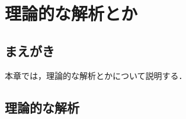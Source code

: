 \chapter{理論的な解析とか}
\label{sec:theoretical_analysis}

\section{まえがき}
本章では，理論的な解析とかについて説明する．

\section{理論的な解析}
\label{sec:analysis}
